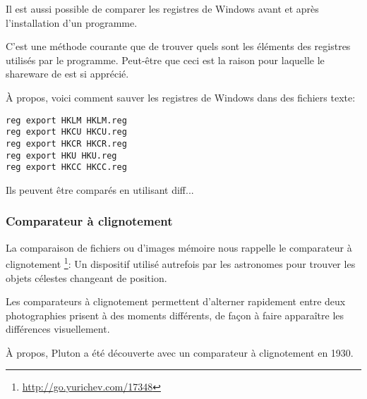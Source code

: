 Il est aussi possible de comparer les registres de Windows avant et après l'installation
d'un programme.

C'est une méthode courante  que de trouver quels sont les éléments des registres
utilisés par le programme. Peut-être que ceci est la raison pour laquelle le shareware
de  est si apprécié.

À propos, voici comment sauver les registres de Windows dans des fichiers texte:

\begin{lstlisting}
reg export HKLM HKLM.reg
reg export HKCU HKCU.reg
reg export HKCR HKCR.reg
reg export HKU HKU.reg
reg export HKCC HKCC.reg
\end{lstlisting}

Ils peuvent être comparés en utilisant diff...



\subsubsection{Comparateur à clignotement}

La comparaison de fichiers ou d'images mémoire nous rappelle le comparateur à clignotement
\footnote{\url{http://go.yurichev.com/17348}}:
Un dispositif utilisé autrefois par les astronomes pour trouver les objets célestes
changeant de position.

Les comparateurs à clignotement permettent d'alterner rapidement entre deux photographies
prisent à des moments différents, de façon à faire apparaître les différences visuellement.

À propos, Pluton a été découverte avec un comparateur à clignotement en 1930.
